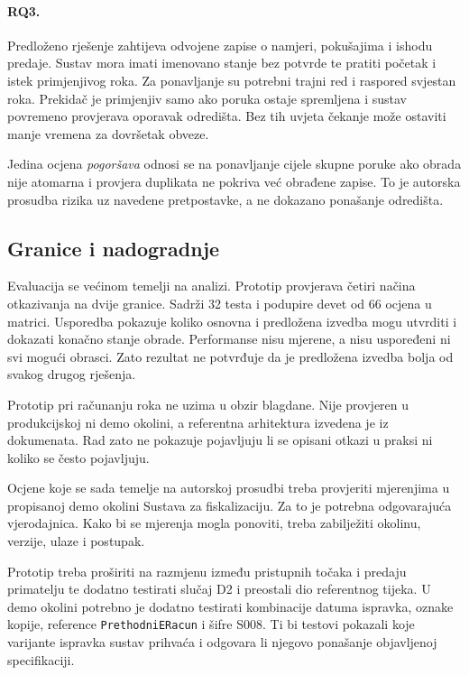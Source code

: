 \paragraph{RQ3.}
Predloženo rješenje zahtijeva odvojene zapise o namjeri, pokušajima i ishodu
predaje. Sustav mora imati imenovano stanje bez potvrde te pratiti početak i
istek primjenjivog roka. Za ponavljanje su potrebni trajni red i raspored
svjestan roka.
Prekidač je primjenjiv samo ako poruka ostaje spremljena i sustav povremeno
provjerava oporavak odredišta. Bez tih uvjeta čekanje može ostaviti manje
vremena za dovršetak obveze.

Jedina ocjena \emph{pogoršava} odnosi se na ponavljanje cijele skupne poruke
ako obrada nije atomarna i provjera duplikata ne pokriva već obrađene zapise.
To je autorska prosudba rizika uz navedene pretpostavke, a ne dokazano
ponašanje odredišta.

\subsection*{Granice i nadogradnje}

Evaluacija se većinom temelji na analizi. Prototip provjerava četiri načina
otkazivanja na dvije granice. Sadrži 32 testa i podupire devet od 66 ocjena u
matrici. Usporedba pokazuje koliko osnovna i predložena izvedba mogu utvrditi
i dokazati konačno stanje obrade. Performanse nisu mjerene, a nisu uspoređeni
ni svi mogući obrasci. Zato rezultat ne potvrđuje da je predložena izvedba
bolja od svakog drugog rješenja.

Prototip pri računanju roka ne uzima u obzir blagdane. Nije provjeren u
produkcijskoj ni demo okolini, a referentna arhitektura izvedena je iz
dokumenata. Rad zato ne pokazuje pojavljuju li se opisani otkazi u praksi ni
koliko se često pojavljuju.

Ocjene koje se sada temelje na autorskoj prosudbi treba provjeriti mjerenjima
u propisanoj demo okolini Sustava za fiskalizaciju. Za to je potrebna
odgovarajuća vjerodajnica. Kako bi se mjerenja mogla ponoviti, treba
zabilježiti okolinu, verzije, ulaze i postupak.

Prototip treba proširiti na razmjenu između pristupnih točaka i predaju
primatelju te dodatno testirati slučaj D2 i preostali dio referentnog tijeka.
U demo okolini potrebno je dodatno testirati kombinacije datuma ispravka,
oznake kopije, reference \texttt{PrethodniERacun} i šifre S008. Ti bi testovi
pokazali koje varijante ispravka sustav prihvaća i odgovara li njegovo
ponašanje objavljenoj specifikaciji.
